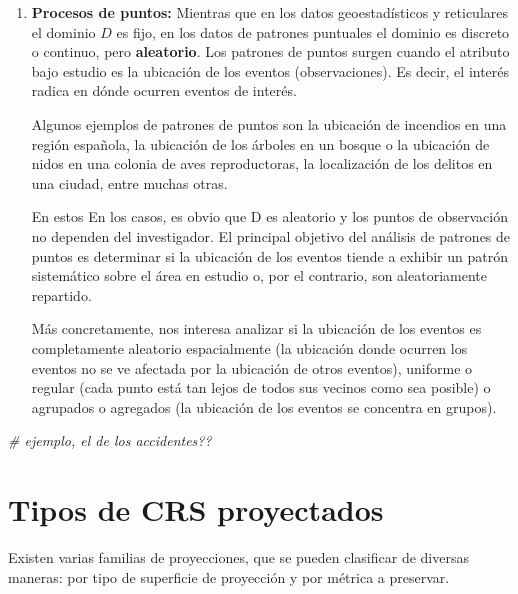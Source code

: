 \documentclass[
]{report}
\newenvironment{Shaded}{\begin{snugshade}}{\end{snugshade}}
\newcommand{\CommentTok}[1]{\textcolor[rgb]{0.56,0.35,0.01}{\textit{#1}}}
\begin{document}
\begin{enumerate}
\def\labelenumi{\arabic{enumi}.}
\setcounter{enumi}{2}
\item
  \textbf{Procesos de puntos:} Mientras que en los datos geoestadísticos y
  reticulares el dominio \(D\) es fijo, en los datos de patrones puntuales el
  dominio es discreto o continuo, pero \textbf{aleatorio}. Los patrones de puntos
  surgen cuando el atributo bajo estudio es la ubicación de los eventos
  (observaciones). Es decir, el interés radica en dónde ocurren eventos de
  interés.

  Algunos ejemplos de patrones de puntos son la ubicación de incendios en una
  región española, la ubicación de los árboles en un bosque o la ubicación de
  nidos en una colonia de aves reproductoras, la localización de los delitos
  en una ciudad, entre muchas otras.

  En estos En los casos, es obvio que D es aleatorio y los puntos de
  observación no dependen del investigador. El principal objetivo del análisis
  de patrones de puntos es determinar si la ubicación de los eventos tiende a
  exhibir un patrón sistemático sobre el área en estudio o, por el contrario,
  son aleatoriamente repartido.

  Más concretamente, nos interesa analizar si la ubicación de los eventos es
  completamente aleatorio espacialmente (la ubicación donde ocurren los
  eventos no se ve afectada por la ubicación de otros eventos), uniforme o
  regular (cada punto está tan lejos de todos sus vecinos como sea posible) o
  agrupados o agregados (la ubicación de los eventos se concentra en grupos).
\end{enumerate}

\begin{Shaded}
\begin{Highlighting}[]
\CommentTok{\# ejemplo, el de los accidentes??}
\end{Highlighting}
\end{Shaded}

\hypertarget{appendix-anexo}{%
\appendix}


\hypertarget{crsproy}{%
\chapter{Tipos de CRS proyectados}\label{crsproy}}

Existen varias familias de proyecciones, que se pueden clasificar de diversas
maneras: por tipo de superficie de proyección y por métrica a preservar.
\end{document}
